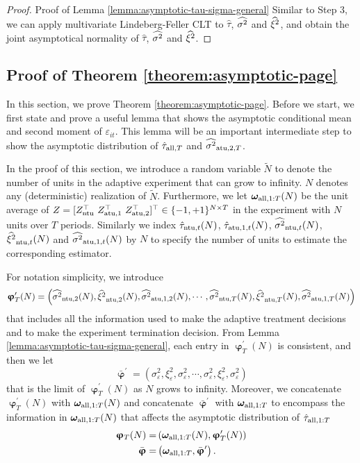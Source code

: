 \begin{proof}{Proof of Lemma \ref{lemma:asymptotic-tau-sigma-general}}
Similar to Step 3, we can apply multivariate Lindeberg-Feller CLT to $\hat{\tau}$, $\widehat{\sigma^2}$ and $\widehat{\xi^2}$, and obtain the joint asymptotical normality of $\hat{\tau}$, $\widehat{\sigma^2}$ and $\widehat{\xi^2}$.
\halmos

\end{proof} 



\subsection{Proof of Theorem \ref{theorem:asymptotic-page}}

In this section, we prove Theorem \ref{theorem:asymptotic-page}. Before we start, we first state and prove a useful lemma that shows the asymptotic conditional mean and second moment of $\varepsilon_{it}$. This lemma will be an important intermediate step to show the asymptotic distribution of $\hat{\tau}_{\mathrm{all}, T}$ and $\widehat{\sigma^2}_{\mathrm{atu},2,T}$.

In the proof of this section, we introduce a random variable $\tilde{N}$ to denote the number of units in the adaptive experiment that can grow to infinity. $N$ denotes any (deterministic) realization of $\tilde{N}$. Furthermore, we let $\bm{\omega}_{\mathrm{all}, 1:T}(N)$ be the unit average of $Z = [Z_{\mathrm{ntu}}^\top~ Z_{\mathrm{atu},1}^\top~ Z_{\mathrm{atu},2}^\top]^\top \in \{-1,+1\}^{N \times T}$ in the experiment with $N$ units over $T$ periods. Similarly we index $\hat{\tau}_{\mathrm{ntu},t}(N)$, $\hat{\tau}_{\mathrm{atu},1,t}(N)$, $\widehat{\sigma^2}_{\mathrm{ntu},t}(N)$, $\widehat{\xi^2}_{\mathrm{ntu},t}(N)$ and $\widehat{\sigma^2}_{\mathrm{atu},1,t}(N)$ by $N$ to specify the number of units to estimate the corresponding estimator.

For notation simplicity, we introduce 
\[\bm{\upvarphi}^\prime_T(N) = \left(\widehat{\sigma^2}_{\mathrm{ntu},2}(N), \widehat{\xi^2}_{\mathrm{ntu},2}(N), \widehat{\sigma^2}_{\mathrm{atu},1,2}(N), \cdots, \widehat{\sigma^2}_{\mathrm{ntu},T}(N), \widehat{\xi^2}_{\mathrm{ntu},T}(N), \widehat{\sigma^2}_{\mathrm{atu},1,T}(N) \right) \]
that includes all the information used to make the adaptive treatment decisions and to make the experiment termination decision. From Lemma \ref{lemma:asymptotic-tau-sigma-general}, each entry in $\bm{\upvarphi}^\prime_T(N)$ is consistent, and then we let 
\[\bar{\bm{\upvarphi}}^\prime  = \left(\sigma_\varepsilon^2, \xi_\varepsilon^2, \sigma_\varepsilon^2, \cdots, \sigma_\varepsilon^2, \xi_\varepsilon^2, \sigma_\varepsilon^2 \right) \]
that is the limit of $\bm{\upvarphi}^\prime_T(N)$ as $N$ grows to infinity. Moreover, we concatenate $\bm{\upvarphi}^\prime_T(N)$ with  $\bm{\omega}_{\mathrm{all}, 1:T}(N)$ and concatenate $\bar{\bm{\upvarphi}}^\prime$ with $\bm{\omega}_{\mathrm{all}, 1:T}$ to encompass the information in $\bm{\omega}_{\mathrm{all}, 1:T}(N)$ that affects the asymptotic distribution of $\hat{\tau}_{\mathrm{all},1:T}$
\begin{align*}
    \bm{\upvarphi}_T(N) =& \left(\bm{\omega}_{\mathrm{all}, 1:T}(N),  \bm{\upvarphi}^\prime_T(N) \right) \\
    \bar{\bm{\upvarphi}} =& \left(\bm{\omega}_{\mathrm{all}, 1:T}, \bar{\bm{\upvarphi}}^\prime\right).
\end{align*}

